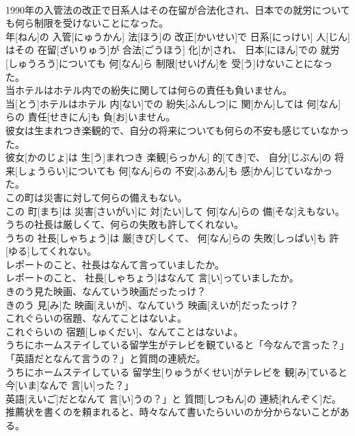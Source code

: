 \documentclass[8pt]{extreport}
\begin{document}
\begin{CJK}{UTF8}{min}
\\	1990年の入管法の改正で日系人はその在留が合法化され、日本での就労についても何ら制限を受けないことになった。	
\\	年[ねん]の 入管[にゅうかん] 法[ほう]の 改正[かいせい]で 日系[にっけい] 人[じん]はその 在留[ざいりゅう]が 合法[ごうほう] 化[か]され、 日本[にほん]での 就労[しゅうろう]についても 何[なん]ら 制限[せいげん]を 受[う]けないことになった。
\\	当ホテルはホテル内での紛失に関しては何らの責任も負いません。	
\\	当[とう]ホテルはホテル 内[ない]での 紛失[ふんしつ]に 関[かん]しては 何[なん]らの 責任[せきにん]も 負[お]いません。
\\	彼女は生まれつき楽観的で、自分の将来についても何らの不安も感じていなかった。	
\\	彼女[かのじょ]は 生[う]まれつき 楽観[らっかん] 的[てき]で、 自分[じぶん]の 将来[しょうらい]についても 何[なん]らの 不安[ふあん]も 感[かん]じていなかった。
\\	この町は災害に対して何らの備えもない。	
\\	この 町[まち]は 災害[さいがい]に 対[たい]して 何[なん]らの 備[そな]えもない。
\\	うちの社長は厳しくて、何らの失敗も許してくれない。	
\\	うちの 社長[しゃちょう]は 厳[きび]しくて、 何[なん]らの 失敗[しっぱい]も 許[ゆる]してくれない。
\\	レポートのこと、社長はなんて言っていましたか。	
\\	レポートのこと、 社長[しゃちょう]はなんて 言[い]っていましたか。
\\	きのう見た映画、なんていう映画だったっけ？	
\\	きのう 見[み]た 映画[えいが]、なんていう 映画[えいが]だったっけ？
\\	これぐらいの宿題、なんてことはないよ。	
\\	これぐらいの 宿題[しゅくだい]、なんてことはないよ。
\\	うちにホームステイしている留学生がテレビを観ていると「今なんで言った？」「英語だとなんて言うの？」と質問の連続だ。	
\\	うちにホームステイしている 留学生[りゅうがくせい]がテレビを 観[み]ていると
\\	今[いま]なんで 言[い]った？」
\\	英語[えいご]だとなんて 言[い]うの？」と 質問[しつもん]の 連続[れんぞく]だ。
\\	推薦状を書くのを頼まれると、時々なんて書いたらいいのか分からないことがある。	

\end{CJK}
\end{document}
